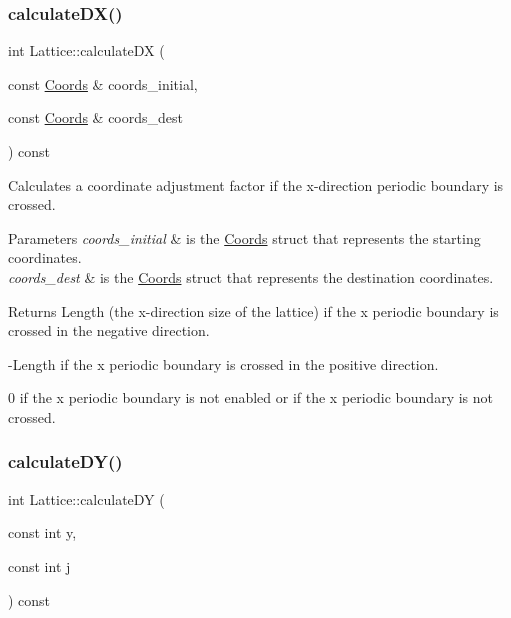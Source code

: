 \subsubsection{\texorpdfstring{calculate\+D\+X()}{calculateDX()}\hspace{0.1cm}{\footnotesize\ttfamily [2/2]}}
{\footnotesize\ttfamily int Lattice\+::calculate\+DX (\begin{DoxyParamCaption}\item[{const \hyperlink{struct_coords}{Coords} \&}]{coords\+\_\+initial,  }\item[{const \hyperlink{struct_coords}{Coords} \&}]{coords\+\_\+dest }\end{DoxyParamCaption}) const}



Calculates a coordinate adjustment factor if the x-\/direction periodic boundary is crossed. 


\begin{DoxyParams}{Parameters}
{\em coords\+\_\+initial} & is the \hyperlink{struct_coords}{Coords} struct that represents the starting coordinates. \\
\hline
{\em coords\+\_\+dest} & is the \hyperlink{struct_coords}{Coords} struct that represents the destination coordinates. \\
\hline
\end{DoxyParams}
\begin{DoxyReturn}{Returns}
Length (the x-\/direction size of the lattice) if the x periodic boundary is crossed in the negative direction. 

-\/\+Length if the x periodic boundary is crossed in the positive direction. 

0 if the x periodic boundary is not enabled or if the x periodic boundary is not crossed. 
\end{DoxyReturn}
\mbox{\label{class_lattice_acdeca889f7df11fe299f8b7941198c83}} 
\subsubsection{\texorpdfstring{calculate\+D\+Y()}{calculateDY()}\hspace{0.1cm}{\footnotesize\ttfamily [1/2]}}
{\footnotesize\ttfamily int Lattice\+::calculate\+DY (\begin{DoxyParamCaption}\item[{const int}]{y,  }\item[{const int}]{j }\end{DoxyParamCaption}) const}



